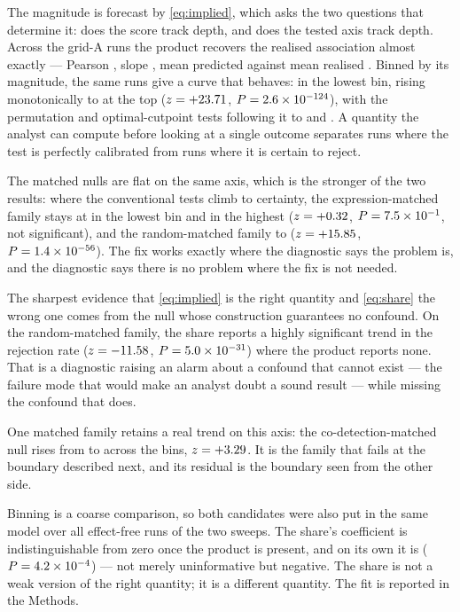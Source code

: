 \documentclass[11pt]{article}
\begin{document}
The magnitude is forecast by \eqref{eq:implied}, which asks the two questions
that determine it: does the score track depth, and does the tested axis track
depth. Across the \impliedN{} grid-A runs the product recovers the realised
association almost exactly --- Pearson \impliedCorr{}, slope \impliedSlope{},
mean predicted \impliedMeanPredicted{} against mean realised
\impliedMeanRealised{}. Binned by its magnitude, the same runs give a curve that
behaves: \impliedCellcorLowRate{} in the lowest bin, rising monotonically to
\impliedCellcorHighRate{} at the top ($z=+23.71$,
$P=2.6\times10^{-124}$), with the permutation and optimal-cutpoint tests
following it to \impliedPermutedHighRate{} and \impliedCutoptHighRate{}. A
quantity the analyst can compute before looking at a single outcome separates
runs where the test is perfectly calibrated from runs where it is certain to
reject.

The matched nulls are flat on the same axis, which is the stronger of the two
results: where the conventional tests climb to certainty, the expression-matched
family stays at \impliedExprLowRate{} in the lowest bin and
\impliedExprHighRate{} in the highest ($z=+0.32$,
$P=7.5\times10^{-1}$, not significant), and the random-matched family
\impliedRandLowRate{} to \impliedRandHighRate{} ($z=+15.85$,
$P=1.4\times10^{-56}$). The fix works exactly where the diagnostic says the
problem is, and the diagnostic says there is no problem where the fix is not
needed.

The sharpest evidence that \eqref{eq:implied} is the right quantity and
\eqref{eq:share} the wrong one comes from the null whose construction guarantees
no confound. On the random-matched family, the share reports a highly
significant trend in the rejection rate ($z=-11.58$,
$P=5.0\times10^{-31}$) where the product reports none. That is a diagnostic
raising an alarm about a confound that cannot exist --- the failure mode that
would make an analyst doubt a sound result --- while missing the confound that
does.

One matched family retains a real trend on this axis: the co-detection-matched
null rises from \impliedCodetLowRate{} to \impliedCodetHighRate{} across the
bins, $z=+3.29$. It is the family that fails at the boundary
described next, and its residual is the boundary seen from the other side.

Binning is a coarse comparison, so both candidates were also put in the same
model over all \jointN{} effect-free runs of the two sweeps. The share's
coefficient is indistinguishable from zero once the product is present, and on
its own it is \jointShareAloneCoef{} ($P=4.2\times10^{-4}$) --- not merely
uninformative but negative. The share is not a weak version of the right
quantity; it is a different quantity. The fit is reported in the Methods.
\end{document}
